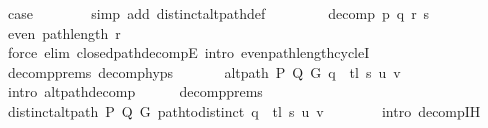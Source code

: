 \begin{isabellebody}
\ {\isacharquery}{\kern0pt}case\isanewline
\ \ \ \ \ \ \isamarkupfalse%
\ {\isacharparenleft}{\kern0pt}simp\ add{\isacharcolon}{\kern0pt}\ distinct{\isacharunderscore}{\kern0pt}alt{\isacharunderscore}{\kern0pt}path{\isacharunderscore}{\kern0pt}def{\isacharparenright}{\kern0pt}\isanewline
\ \ \isamarkupfalse%
\isanewline
\ \ \ \ \isamarkupfalse%
\ {\isacharparenleft}{\kern0pt}decomp\ p\ q\ r\ s{\isacharparenright}{\kern0pt}\isanewline
\ \ \ \ \isamarkupfalse%
\ {\isachardoublequoteopen}even\ {\isacharparenleft}{\kern0pt}path{\isacharunderscore}{\kern0pt}length\ r{\isacharparenright}{\kern0pt}{\isachardoublequoteclose}\isanewline
\ \ \ \ \ \ \isamarkupfalse%
\ {\isacharparenleft}{\kern0pt}force\ elim{\isacharcolon}{\kern0pt}\ closed{\isacharunderscore}{\kern0pt}path{\isacharunderscore}{\kern0pt}decompE{\isacharunderscore}{\kern0pt}{}\ intro{\isacharcolon}{\kern0pt}\ even{\isacharunderscore}{\kern0pt}path{\isacharunderscore}{\kern0pt}length{\isacharunderscore}{\kern0pt}cycleI{\isacharparenright}{\kern0pt}\isanewline
\ \ \ \ \isamarkupfalse%
\ decomp{\isachardot}{\kern0pt}prems{\isacharparenleft}{\kern0pt}{}{\isacharparenright}{\kern0pt}\ decomp{\isachardot}{\kern0pt}hyps{\isacharparenleft}{\kern0pt}{}{\isacharcomma}{\kern0pt}\ {}{\isacharparenright}{\kern0pt}\isanewline
\ \ \ \ \isamarkupfalse%
\ {\isachardoublequoteopen}alt{\isacharunderscore}{\kern0pt}path\ P\ Q\ G\ {\isacharparenleft}{\kern0pt}q\ {\isacharat}{\kern0pt}\ tl\ s{\isacharparenright}{\kern0pt}\ u\ v{\isachardoublequoteclose}\isanewline
\ \ \ \ \ \ \isamarkupfalse%
\ {\isacharparenleft}{\kern0pt}intro\ alt{\isacharunderscore}{\kern0pt}path{\isacharunderscore}{\kern0pt}decomp{\isacharparenright}{\kern0pt}\isanewline
\ \ \ \ \isamarkupfalse%
\ decomp{\isachardot}{\kern0pt}prems{\isacharparenleft}{\kern0pt}{}{\isacharparenright}{\kern0pt}\isanewline
\ \ \ \ \isamarkupfalse%
\ {\isachardoublequoteopen}distinct{\isacharunderscore}{\kern0pt}alt{\isacharunderscore}{\kern0pt}path\ P\ Q\ G\ {\isacharparenleft}{\kern0pt}path{\isacharunderscore}{\kern0pt}to{\isacharunderscore}{\kern0pt}distinct\ {\isacharparenleft}{\kern0pt}q\ {\isacharat}{\kern0pt}\ tl\ s{\isacharparenright}{\kern0pt}{\isacharparenright}{\kern0pt}\ u\ v{\isachardoublequoteclose}\isanewline
\ \ \ \ \ \ \isamarkupfalse%
\ {\isacharparenleft}{\kern0pt}intro\ decomp{\isachardot}{\kern0pt}IH{\isacharparenright}{\kern0pt}\isanewline

\end{isabellebody}
